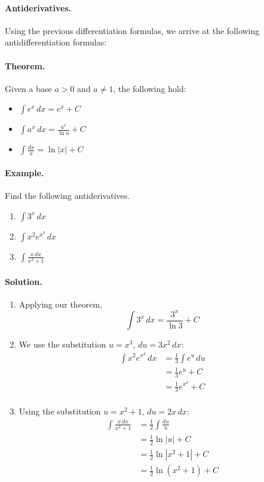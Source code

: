 \documentclass[12pt]{report}
\begin{document}
\paragraph{Antiderivatives.} Using the previous differentiation formulas, we arrive at the following antidifferentiation formulas:

\paragraph{Theorem.} Given a base $a>0$ and $a\neq 1$, the following hold:
\begin{itemize}
\item $\int e^x\,dx=e^x+C$
\item $\int a^x\,dx=\frac{a^x}{\ln a}+C$
\item $\int \frac{dx}{x}=\ln|x|+C$
\end{itemize}

\paragraph{Example.} Find the following antiderivatives.
\begin{enumerate}
\item $\int 3^x\,dx$
\item $\int x^2 e^{x^3}\,dx$
\item $\int \frac{x\,dx}{x^2+1}$
\end{enumerate}

\paragraph{Solution.}
\begin{enumerate}
\item Applying our theorem, \[\int 3^x\, dx=\frac{3^x}{\ln 3}+C\]
\item We use the substitution $u=x^3$, $du=3x^2\,dx$:
\begin{equation*}
\begin{split}
\int x^2e^{x^3}\,dx &=\frac13 \int e^u\,du\\
&=\frac 13 e^u+C\\
&=\frac 13 e^{x^3}+C\\
\end{split}
\end{equation*}
\item Using the substitution $u=x^2+1$, $du=2x\,dx$:
\begin{equation*}
\begin{split}
\int \frac{x\,dx}{x^2+1}&=\frac 12 \int \frac{du}{u}\\
&=\frac 12 \ln|u|+C\\
&=\frac 12 \ln|x^2+1|+C\\
&=\frac 12 \ln(x^2+1)+C\\
\end{split}
\end{equation*}
\end{enumerate}
\end{document}
